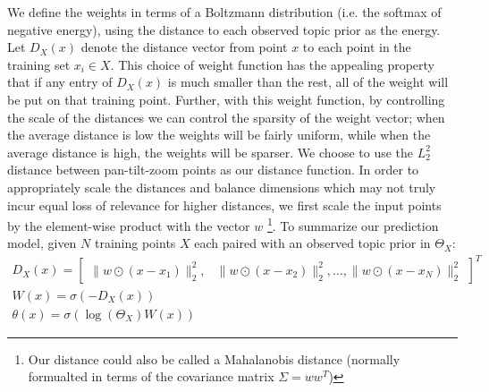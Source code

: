 We define the weights in terms of a Boltzmann distribution (i.e. the softmax of negative energy), using the distance to each observed topic prior as the energy. Let $D_X(x)$ denote the distance vector from point $x$ to each point in the training set $x_i \in X$. This choice of weight function has the appealing property that if any entry of $D_X(x)$ is much smaller than the rest, all of the weight will be put on that training point. Further, with this weight function, by controlling the scale of the distances we can control the sparsity of the weight vector; when the average distance is low the weights will be fairly uniform, while when the average distance is high, the weights will be sparser. We choose to use the $\mathit{L}_2^2$ distance between pan-tilt-zoom points as our distance function. In order to appropriately scale the distances and balance dimensions which may not truly incur equal loss of relevance for higher distances, we first scale the input points by the element-wise product with the vector $w$ \footnote{Our distance could also be called a Mahalanobis distance (normally formualted in terms of the covariance matrix $\Sigma = ww^T$)}. To summarize our prediction model, given $N$ training points $X$ each paired with an observed topic prior in $\Theta_X$:
\begin{equation} \label{eqn:spatial-prediction}
\begin{split}
    D_X(x) = 
    \begin{bmatrix}
    \|w \odot (x - x_1) \|_2^2, & \|w \odot (x - x_2) \|_2^2, \ldots, \|w \odot (x - x_N) \|_2^2
    \end{bmatrix}^T\\
    W(x) = \sigma \left( -D_{X}(x) \right)\\
    \theta(x) = \sigma \left( \log \left(\Theta_X \right) W(x) \right)
\end{split}
\end{equation}

